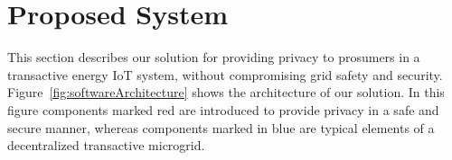\section{Proposed System}

This section describes our solution for providing privacy to prosumers
in a transactive energy IoT system, without compromising grid safety
and security.
Figure~\ref{fig:softwareArchitecture} shows the architecture of 
our solution.  In this figure components marked red are introduced to
provide privacy in a safe and secure manner, whereas components marked
in blue are typical elements of a decentralized transactive microgrid.
